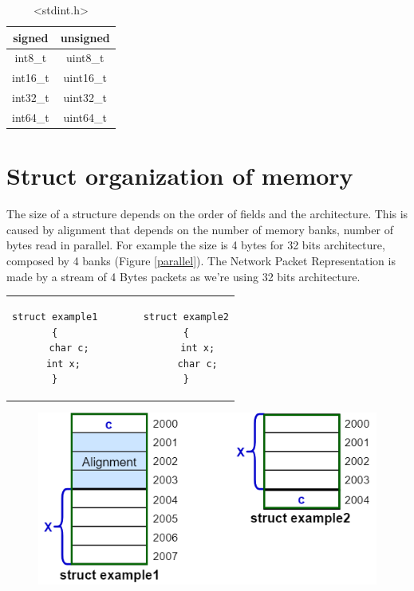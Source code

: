 \begin{table}[h]
\centering
\begin{tabular}{|c|c|}
\hline
\textbf{signed}&{unsigned}\\
\hline
{int8\_t}&{uint8\_t}\\
{int16\_t}&{uint16\_t}\\
{int32\_t}&{uint32\_t}\\
{int64\_t}&{uint64\_t}\\
\hline
\end{tabular}\caption{<stdint.h>}
\end{table}
\vspace{4cm}
\section{Struct organization of memory}
The size of a structure depends on the order of fields and the architecture. This is caused by alignment that depends on the number of memory banks, number of bytes read in parallel. For example the size is 4 bytes for 32 bits architecture, composed by 4 banks (Figure \ref{parallel}). The Network Packet Representation is made by a stream of 4 Bytes packets as we're using 32 bits architecture. 
\begin{center}
\begin{tabular}{c}
\begin{lstlisting}[linewidth=200pt, basicstyle=\footnotesize\sffamily,]
struct example1        struct example2
{                      {
	char c;	               int x;
	int x;	               char c;
}                      }
\end{lstlisting}
\end{tabular}
\end{center}

\begin{figure}[h]
\centering
\includegraphics[scale=0.5]{Images/Programming/struct}
\end{figure}

